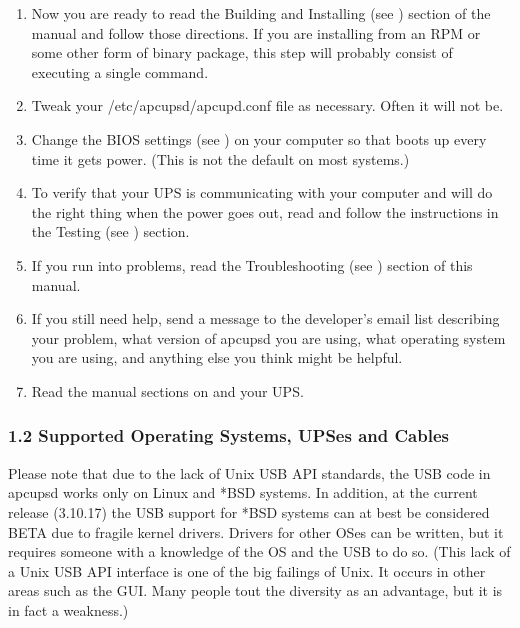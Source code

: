 \begin{enumerate}
\item Now you are ready to read the Building and Installing (see 
) section of the manual
and follow those directions.  If you are installing from an RPM or some other
form of binary package, this step will probably consist of executing a single
command.  
\item Tweak your /etc/apcupsd/apcupd.conf file as necessary. Often it will not
be.  
\item Change the BIOS settings (see 
) on your computer
so that boots up every time it gets power. (This is not the default on most
systems.)  
\item To verify that your UPS is communicating with your computer and will do
the right thing when the power goes out, read and follow the instructions in
the Testing (see 
) section.  
\item If you run into problems, read the Troubleshooting (see 
) section of this
manual.  
\item If you still need help, send a message to the developer's email list 
 describing your problem, what version of apcupsd you
are using, what operating system you are using, and anything else you think
might be helpful.  
\item Read the manual sections on 
 and 
 your UPS.  
\end{enumerate}

\label{Supported-Operating-Systems_003b-UPSes-and-Cables}

\subsubsection*{1.2 Supported Operating Systems, UPSes and Cables}

\label{index-Supported-OSes-8}
\label{index-OSes-Supported-9}
Please note that due to the lack of Unix USB API standards, the USB code in
apcupsd works only on Linux and *BSD systems. In addition, at the current
release (3.10.17) the USB support for *BSD systems can at best be considered
BETA due to fragile kernel drivers. Drivers for other OSes can be written, but
it requires someone with a knowledge of the OS and the USB to do so.  (This
lack of a Unix USB API interface is one of the big failings of Unix.  It
occurs in other areas such as the GUI. Many people tout the diversity as an
advantage, but it is in fact a weakness.)  

